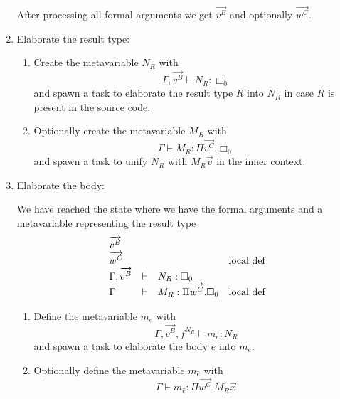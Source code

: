\begin{enumerate}
\begin{enumerate}
        \end{enumerate}

        After processing all formal arguments we get $\vec{v^B}$ and optionally
        $\vec {w^C}$.



    \item Elaborate the result type:

        \begin{enumerate}

            \item Create the metavariable $N_R$ with
                $$
                    \Gamma, \vec{v^B} \vdash N_R : \Box_0
                $$
                and spawn a task to elaborate the result type $R$ into $N_R$ in
                case $R$ is present in the source code.

            \item Optionally create the metavariable $M_R$ with
                $$
                    \Gamma \vdash M_R : \Pi \vec{v^C}. \Box_0
                $$
                and spawn a task to unify $N_R$ with $M_R \vec v$ in the inner
                context.
        \end{enumerate}



    \item Elaborate the body:

        We have reached the state where we have the formal arguments and a
        metavariable representing the result type
        $$
            \begin{array}{lllll} 
                {\overrightarrow {v^B}}
                \\
                {\overrightarrow {w^C}} & &
                & \text {local def}
                \\
                \Gamma, {\overrightarrow {v^B}} &\vdash & N_R : \Box_0
                \\
                \Gamma &\vdash& M_R : \Pi {\overrightarrow {w^C}}. \Box_0
                &\text{local def}
             \end{array}
        $$

        \begin{enumerate}
            \item Define the metavariable $m_e$ with
                $$
                    \Gamma, \vec{v^B}, f^{N_R}
                    \vdash
                    m_e : N_R
                $$
                and spawn a task to elaborate the body $e$ into $m_e$.

            \item Optionally define the metavariable $m_{\hat e}$ with
                $$
                    \Gamma \vdash m_{\hat e}: \Pi \vec {w^C}. M_R \vec x
                $$


\end{enumerate}
\end{enumerate}
